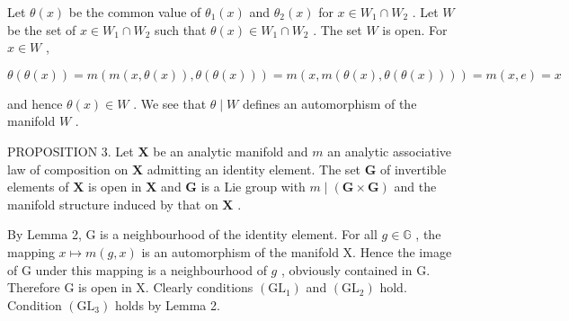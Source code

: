 Let \(\theta(x)\) be the common value of \(\theta_1(x)\) and \(\theta_2(x)\) for \(x \in W_1 \cap W_2\) . Let \(W\) be the set of \(x \in W_1 \cap W_2\) such that \(\theta(x) \in W_1 \cap W_2\) . The set \(W\) is open. For \(x \in W\) ,

\[
\theta (\theta (x)) = m (m (x, \theta (x)), \theta (\theta (x))) = m (x, m (\theta (x), \theta (\theta (x)))) = m (x, e) = x
\]

and hence \(\theta(x) \in W\) . We see that \(\theta \mid W\) defines an automorphism of the manifold \(W\) .

PROPOSITION 3. Let \(\mathbf{X}\) be an analytic manifold and \(m\) an analytic associative law of composition on \(\mathbf{X}\) admitting an identity element. The set \(\mathbf{G}\) of invertible elements of \(\mathbf{X}\) is open in \(\mathbf{X}\) and \(\mathbf{G}\) is a Lie group with \(m \mid (\mathbf{G} \times \mathbf{G})\) and the manifold structure induced by that on \(\mathbf{X}\) .

By Lemma 2, G is a neighbourhood of the identity element. For all \(g \in \mathbb{G}\) , the mapping \(x \mapsto m(g, x)\) is an automorphism of the manifold X. Hence the image of G under this mapping is a neighbourhood of \(g\) , obviously contained in G. Therefore G is open in X. Clearly conditions \((\mathrm{GL}_1)\) and \((\mathrm{GL}_2)\) hold. Condition \((\mathrm{GL}_3)\) holds by Lemma 2.


